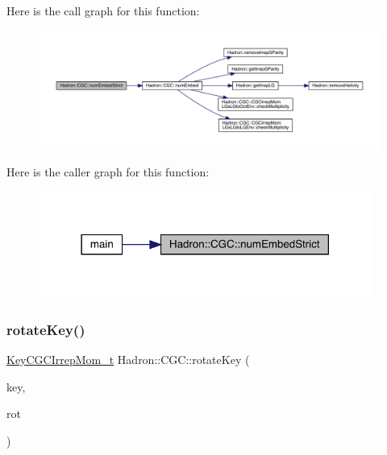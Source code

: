Here is the call graph for this function\+:\nopagebreak
\begin{figure}[H]
\begin{center}
\leavevmode
\includegraphics[width=350pt]{d9/d19/namespaceHadron_1_1CGC_af5aac6c0d70eb7159aa635525bac7629_cgraph}
\end{center}
\end{figure}
Here is the caller graph for this function\+:
\nopagebreak
\begin{figure}[H]
\begin{center}
\leavevmode
\includegraphics[width=310pt]{d9/d19/namespaceHadron_1_1CGC_af5aac6c0d70eb7159aa635525bac7629_icgraph}
\end{center}
\end{figure}
\mbox{\label{namespaceHadron_1_1CGC_acdc26e4dd88e281dc6675da8d6d1b13d}} 
\subsubsection{\texorpdfstring{rotateKey()}{rotateKey()}\hspace{0.1cm}{\footnotesize\ttfamily [1/2]}}
{\footnotesize\ttfamily \mbox{\hyperlink{structHadron_1_1KeyCGCIrrepMom__t}{Key\+C\+G\+C\+Irrep\+Mom\+\_\+t}} Hadron\+::\+C\+G\+C\+::rotate\+Key (\begin{DoxyParamCaption}\item[{const \mbox{\hyperlink{structHadron_1_1KeyCGCIrrepMom__t}{Key\+C\+G\+C\+Irrep\+Mom\+\_\+t}} \&}]{key,  }\item[{const \mbox{\hyperlink{structHadron_1_1RotateVec__t}{Rotate\+Vec\+\_\+t}} \&}]{rot }\end{DoxyParamCaption})}

